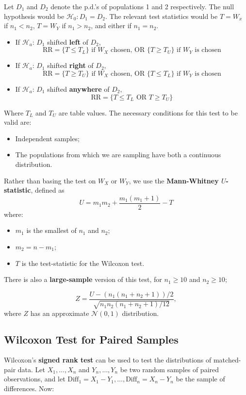 \documentclass[12pt]{article}
\begin{document}
Let $D_1$ and $D_2$ denote the p.d.'s of populations 1 and 2 respectively. The null hypothesis would be $\mathcal{H}_0: D_1 = D_2$. The relevant test statistics would be $T = W_x$ if $n_1 < n_2$, $T = W_Y$ if $n_1 > n_2$, and either if $n_1 = n_2$.
\begin{itemize}
    \item If $\mathcal{H}_a$: $D_1$ shifted \textbf{left} of $D_2$, \[\text{RR} = \{T \leq T_L\} \text{ if } W_X \text{ chosen, OR } \{T \geq T_U\} \text{ if } W_Y \text{ is chosen}\]
    \item If $\mathcal{H}_a$: $D_1$ shifted \textbf{right} of $D_2$, \[\text{RR} = \{T \geq T_U\} \text{ if } W_X \text{ chosen, OR } \{T \leq T_L\} \text{ if } W_Y \text{ is chosen}\]
    \item If $\mathcal{H}_a$: $D_1$ shifted \textbf{anywhere} of $D_2$, \[\text{RR} = \{T \leq T_L\text{ OR }T \geq T_U\}\]
\end{itemize}

Where $T_L$ and $T_U$ are table values. The necessary conditions for this test to be valid are:
\begin{itemize}
    \item Independent samples;
    \item The populations from which we are sampling have both a continuous distribution.
\end{itemize}

Rather than basing the test on $W_X$ or $W_Y$, we use the \textbf{Mann-Whitney $U$-statistic}, defined as \[U = m_1 m_2 + \frac{m_1(m_1 + 1)}{2} - T\] where: \begin{itemize}
    \item $m_1$ is the smallest of $n_1$ and $n_2$;
    \item $m_2 = n - m_1$;
    \item $T$ is the test-statistic for the Wilcoxon test.
\end{itemize}

There is also a \textbf{large-sample} version of this test, for $n_1 \geq 10$ and $n_2 \geq 10$;

\[Z = \frac{U - (n_1(n_1 + n_2 + 1))/2}{\sqrt{n_1n_2(n_1+n_2+1)/12}},\] where $Z$ has an approximate $\mathcal{N}(0,1)$ distribution.

\subsection{Wilcoxon Test for Paired Samples}

Wilcoxon's \textbf{signed rank test} can be used to test the distributions of matched-pair data. Let $X_1, \dots, X_n$ and $Y_n, \dots, Y_n$ be two random samples of paired observations, and let $\text{Diff}_1 = X_1 - Y_1, \dots, \text{Diff}_n = X_n - Y_n$ be the sample of differences. Now:
\end{document}
